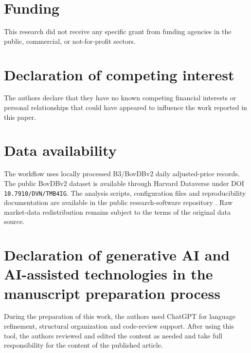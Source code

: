 \section*{Funding}
This research did not receive any specific grant from funding agencies in the public, commercial, or not-for-profit sectors.

\section*{Declaration of competing interest}
The authors declare that they have no known competing financial interests or personal relationships that could have appeared to influence the work reported in this paper.

\section*{Data availability}
The workflow uses locally processed B3/BovDBv2 daily adjusted-price records. The public BovDBv2 dataset is available through Harvard Dataverse under DOI \texttt{10.7910/DVN/TMB4IG}. The analysis scripts, configuration files and reproducibility documentation are available in the public research-software repository \cite{rmt_planar_networks_2026}. Raw market-data redistribution remains subject to the terms of the original data source.

\section*{Declaration of generative AI and AI-assisted technologies in the manuscript preparation process}
During the preparation of this work, the authors used ChatGPT for language refinement, structural organization and code-review support. After using this tool, the authors reviewed and edited the content as needed and take full responsibility for the content of the published article.
